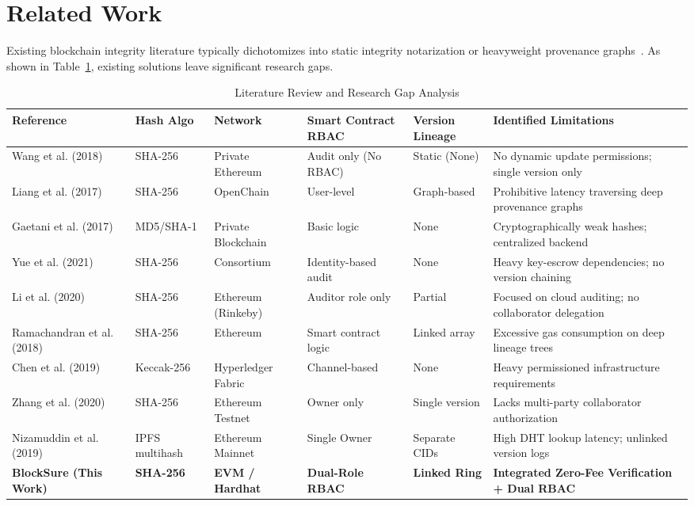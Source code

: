\documentclass[10pt,conference,letterpaper]{IEEEtran}
\begin{document}
\section{Related Work}
Existing blockchain integrity literature typically dichotomizes into static integrity notarization or heavyweight provenance graphs~\cite{steichen2018}. As shown in Table~\ref{tab:related_work}, existing solutions leave significant research gaps.

\begin{table}[t]
\centering
\caption{Literature Review and Research Gap Analysis}
\label{tab:related_work}
\footnotesize
\setlength{\tabcolsep}{4pt}
\begin{tabularx}{\textwidth}{p{2.6cm} p{1.6cm} p{2.2cm} p{2.5cm} p{1.8cm} X}
\toprule
\textbf{Reference} & \textbf{Hash Algo} & \textbf{Network} & \textbf{Smart Contract RBAC} & \textbf{Version Lineage} & \textbf{Identified Limitations} \\
\midrule
Wang et al. (2018)~\cite{wang2018} & SHA-256 & Private Ethereum & Audit only (No RBAC) & Static (None) & No dynamic update permissions; single version only \\
Liang et al. (2017)~\cite{liang2017} & SHA-256 & OpenChain & User-level & Graph-based & Prohibitive latency traversing deep provenance graphs \\
Gaetani et al. (2017)~\cite{gaetani2017} & MD5/SHA-1 & Private Blockchain & Basic logic & None & Cryptographically weak hashes; centralized backend \\
Yue et al. (2021)~\cite{yue2021} & SHA-256 & Consortium & Identity-based audit & None & Heavy key-escrow dependencies; no version chaining \\
Li et al. (2020)~\cite{li2020} & SHA-256 & Ethereum (Rinkeby) & Auditor role only & Partial & Focused on cloud auditing; no collaborator delegation \\
Ramachandran et al. (2018)~\cite{ramachandran2018} & SHA-256 & Ethereum & Smart contract logic & Linked array & Excessive gas consumption on deep lineage trees \\
Chen et al. (2019)~\cite{chen2019} & Keccak-256 & Hyperledger Fabric & Channel-based & None & Heavy permissioned infrastructure requirements \\
Zhang et al. (2020)~\cite{zhang2020} & SHA-256 & Ethereum Testnet & Owner only & Single version & Lacks multi-party collaborator authorization \\
Nizamuddin et al. (2019)~\cite{nizamuddin2019} & IPFS multihash & Ethereum Mainnet & Single Owner & Separate CIDs & High DHT lookup latency; unlinked version logs \\
\midrule
\textbf{BlockSure (This Work)} & \textbf{SHA-256} & \textbf{EVM / Hardhat} & \textbf{Dual-Role RBAC} & \textbf{Linked Ring} & \textbf{Integrated Zero-Fee Verification + Dual RBAC} \\
\bottomrule
\end{tabularx}
\end{table}
\end{document}
